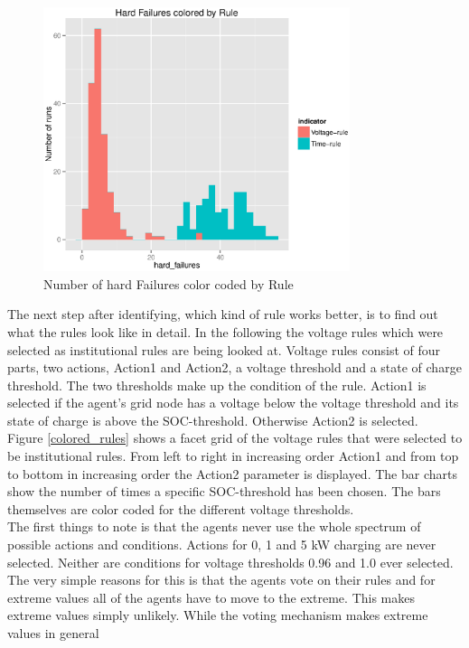\documentclass[a4paper]{article}
\begin{document}
\begin{figure}
\centering
 \includegraphics[width = 0.8\textwidth]{hard_failure_colored_first_look.eps}
 \caption{Number of hard Failures color coded by Rule}
 \label{colored_hard}
\end{figure}
The next step after identifying, which kind of rule works better, is to find out what the rules look like in detail. In the following 
the voltage rules which were selected as institutional rules are being looked at. Voltage rules consist of four parts, 
two actions, Action1 and Action2,
a voltage threshold and a state of charge threshold. The two thresholds make up the condition of the rule. Action1 is selected if 
the agent's grid node has a voltage below the voltage threshold and its state of charge is above the SOC-threshold. Otherwise Action2 is 
selected. \\
Figure \ref{colored_rules} shows a facet grid of the voltage rules that were selected to be institutional rules. From left to right in 
increasing order Action1 and from top to bottom in increasing order the Action2 parameter is displayed. The bar charts show the number
of times a specific SOC-threshold has been chosen. The bars themselves are color coded for the different voltage thresholds. \\
The first things to note is that the agents never use the whole spectrum of possible actions and conditions. Actions for 0, 1 and 5 kW 
charging are never selected. Neither are conditions for voltage thresholds 0.96 and 1.0 ever selected. 
The very simple reasons for this is that the agents vote on their rules and for extreme values all of the agents 
have to move to the extreme. This makes extreme values simply unlikely. While the voting mechanism makes extreme values in general 
\end{document}
